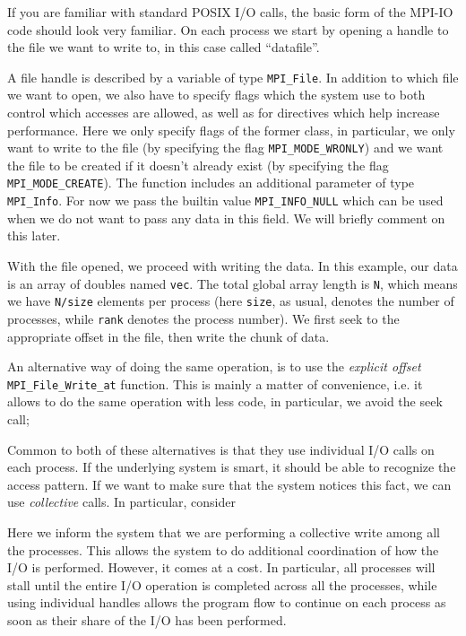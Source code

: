 If you are familiar with standard POSIX I/O calls, the basic form of
the MPI-IO code should look very familiar. On each process we start by
opening a handle to the file we want to write to, in this case called
``datafile''.

A file handle is described by a variable of type \texttt{MPI\_File}. In addition
to which file we want to open, we also have to specify flags which the system
use to both control which accesses are allowed, as well as for directives which
help increase performance. Here we only specify flags of the former class, in
particular, we only want to write to the file (by specifying the flag
\texttt{MPI\_MODE\_WRONLY}) and we want the file to be created if it doesn't
already exist (by specifying the flag \texttt{MPI\_MODE\_CREATE}). The function
includes an additional parameter of type \texttt{MPI\_Info}. For now we pass the
builtin value \texttt{MPI\_INFO\_NULL} which can be used when we do not want to
pass any data in this field. We will briefly comment on this later.

With the file opened, we proceed with writing the data. In this example, our
data is an array of doubles named \texttt{vec}. The total global array length is
\texttt{N}, which means we have \texttt{N/size} elements per process (here
\texttt{size}, as usual, denotes the number of processes, while \texttt{rank}
denotes the process number). We first seek to the appropriate offset in the
file, then write the chunk of data.


An alternative way of doing the same operation, is to use the \emph{explicit
offset} \texttt{MPI\_File\_Write\_at} function. This is mainly a matter of
convenience, i.e. it allows to do the same operation with less code, in
particular, we avoid the seek call;


Common to both of these alternatives is that they use individual I/O calls on
each process. If the underlying system is smart, it should be able to recognize
the access pattern. If we want to make sure that the system notices this fact,
we can use \emph{collective} calls. In particular, consider

Here we inform the system that we are performing a collective write among all
the processes. This allows the system to do additional coordination of how the
I/O is performed. However, it comes at a cost. In particular, all processes will
stall until the entire I/O operation is completed across all the processes,
while using individual handles allows the program flow to continue on each
process as soon as their share of the I/O has been performed.

